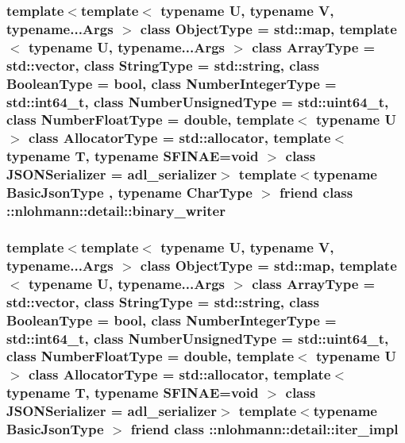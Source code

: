 \subsubsection[{\texorpdfstring{\+::nlohmann\+::detail\+::binary\+\_\+writer}{::nlohmann::detail::binary_writer}}]{\setlength{\rightskip}{0pt plus 5cm}template$<$template$<$ typename U, typename V, typename...\+Args $>$ class Object\+Type = std\+::map, template$<$ typename U, typename...\+Args $>$ class Array\+Type = std\+::vector, class String\+Type  = std\+::string, class Boolean\+Type  = bool, class Number\+Integer\+Type  = std\+::int64\+\_\+t, class Number\+Unsigned\+Type  = std\+::uint64\+\_\+t, class Number\+Float\+Type  = double, template$<$ typename U $>$ class Allocator\+Type = std\+::allocator, template$<$ typename T, typename S\+F\+I\+N\+A\+E=void $>$ class J\+S\+O\+N\+Serializer = adl\+\_\+serializer$>$ template$<$typename Basic\+Json\+Type , typename Char\+Type $>$ friend class \+::{\bf nlohmann\+::detail\+::binary\+\_\+writer}\hspace{0.3cm}{\ttfamily [friend]}}\hypertarget{classnlohmann_1_1basic__json_a69d491bbda88ade6d3c7a2b11309e8bf}{}\label{classnlohmann_1_1basic__json_a69d491bbda88ade6d3c7a2b11309e8bf}
\subsubsection[{\texorpdfstring{\+::nlohmann\+::detail\+::iter\+\_\+impl}{::nlohmann::detail::iter_impl}}]{\setlength{\rightskip}{0pt plus 5cm}template$<$template$<$ typename U, typename V, typename...\+Args $>$ class Object\+Type = std\+::map, template$<$ typename U, typename...\+Args $>$ class Array\+Type = std\+::vector, class String\+Type  = std\+::string, class Boolean\+Type  = bool, class Number\+Integer\+Type  = std\+::int64\+\_\+t, class Number\+Unsigned\+Type  = std\+::uint64\+\_\+t, class Number\+Float\+Type  = double, template$<$ typename U $>$ class Allocator\+Type = std\+::allocator, template$<$ typename T, typename S\+F\+I\+N\+A\+E=void $>$ class J\+S\+O\+N\+Serializer = adl\+\_\+serializer$>$ template$<$typename Basic\+Json\+Type $>$ friend class \+::{\bf nlohmann\+::detail\+::iter\+\_\+impl}\hspace{0.3cm}{\ttfamily [friend]}}\hypertarget{classnlohmann_1_1basic__json_a842e5c7ca096025c18b11e715d3401f4}{}\label{classnlohmann_1_1basic__json_a842e5c7ca096025c18b11e715d3401f4}
